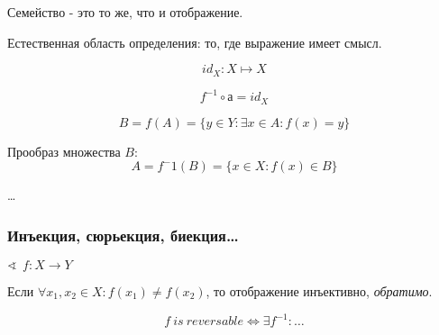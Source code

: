 \documentclass[12pt, a4paper]{article}
\begin{document}
    \begin{definition}
      Семейство - это то же, что и отображение.
    \end{definition}

    \begin{definition}
      Естественная область определения: то, где выражение имеет смысл.
    \end{definition}

    \begin{definition}
        \begin{equation}
          id_X: X \mapsto X
        \end{equation}
    \end{definition}

    \begin{equation}
      f^{-1} \circ а = id_X
    \end{equation}

    \begin{definition}[Образ]
      \begin{equation}
        B = f(A) = \{ y \in Y: \exists x \in A: f(x) = y\}
      \end{equation}
    \end{definition}

    \begin{definition}[Прообраз]
      Прообраз множества $B$:
      \begin{equation}
        A = f^-1(B) = \{x \in X: f(x) \in B \}
      \end{equation}  
    \end{definition}

    \begin{definition}[Композиция]
      \ldots
    \end{definition}

    \subsubsection{Инъекция, сюрьекция, биекция\ldots}
    $\sphericalangle ~~ f: X \longrightarrow Y$

    \begin{definition}
      Если $\forall x_1, x_2 \in X: f(x_1) \neq f(x_2)$, то отображение инъективно, \textit{обратимо}.
    \end{definition}

    \begin{definition}
      \begin{equation}
        f ~ is ~ reversable \Longleftrightarrow \exists f^{-1}: \ldots
      \end{equation}
    \end{definition}
\end{document}
